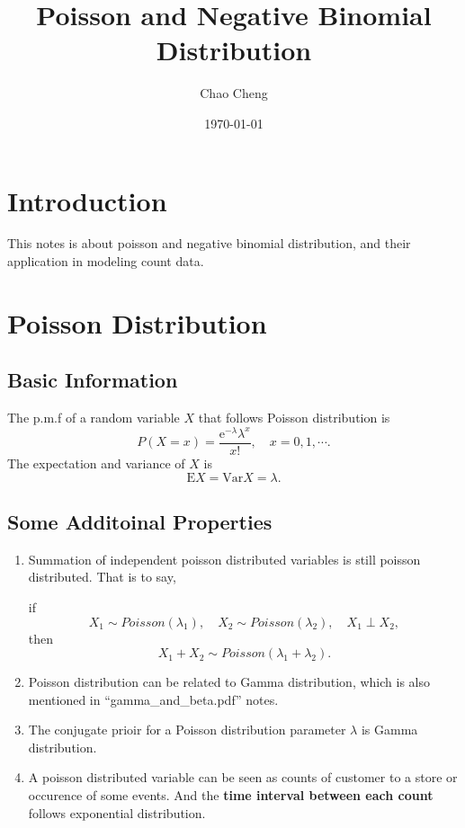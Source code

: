 \documentclass[a4paper,12pt]{article}
\title{Poisson and Negative Binomial Distribution}
\author{Chao Cheng}
\date{\today}
\begin{document}
\maketitle

\tableofcontents{}

\section{Introduction}
\label{sec:introduction}

This notes is about poisson and negative binomial distribution, and their application in modeling count data.

\section{Poisson Distribution}
\label{sec:poisson-distribution}

\subsection{Basic Information}
\label{sec:basic-information}

The p.m.f of a random variable $X$ that follows Poisson distribution is
\[
  P\left(X = x\right) = \frac{\mathrm{e}^{-\lambda}\lambda^x}{x!}, \quad x = 0, 1, \cdots.
\]
The expectation and variance of $X$ is
\[
  \mathrm{E}X = \mathrm{Var}X = \lambda.
\]

\subsection{Some Additoinal Properties}
\label{sec:some-addit-prop}

\begin{enumerate}
\item Summation of independent poisson distributed variables is still poisson distributed. That is to say,
  \par
  if
  \[
    X_1\sim Poisson(\lambda_1),\quad
    X_2\sim Poisson(\lambda_2),\quad
    X_1 \perp X_2
    ,
  \]
  then
  \[
    X_1 + X_2 \sim Poisson(\lambda_1 + \lambda_2)
    .
  \]
\item Poisson distribution can be related to Gamma distribution, which is also mentioned in ``gamma\_and\_beta.pdf'' notes.
\item The conjugate prioir for a Poisson distribution parameter $\lambda$ is Gamma distribution.
\item A poisson distributed variable can be seen as counts of customer to a store or occurence of some events. And the \textbf{time interval between each count} follows exponential distribution. 
\end{enumerate}
\end{document}

